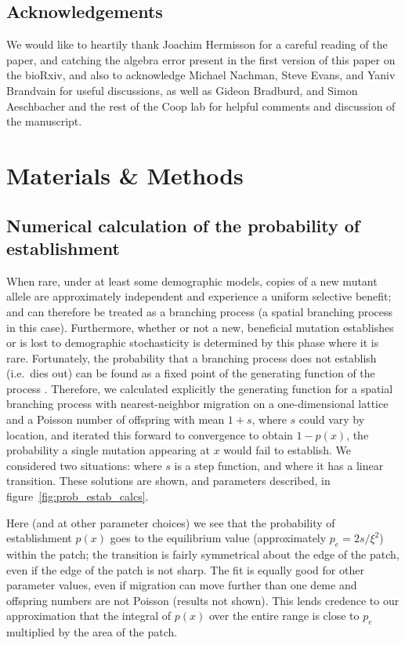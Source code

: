 \documentclass{article}
\newcommand{\citep}[1]{\cite{#1}}
\begin{document}
\subsection*{Acknowledgements}
We would like to heartily thank Joachim Hermisson for a careful reading of the paper,
and catching the algebra error present in the first version of this paper on the bioRxiv,
and also to acknowledge Michael Nachman, Steve Evans, and Yaniv Brandvain for useful discussions, 
as well as Gideon Bradburd, and Simon Aeschbacher and the rest of the Coop lab
for helpful comments and discussion of the manuscript.

\section*{Materials \& Methods}

\subsection[Probability of Establishment]{Numerical calculation of the probability of establishment}
\label{apx:establishment_sims}

When rare, under at least some demographic models,
copies of a new mutant allele are approximately independent and experience a uniform selective benefit;
and can therefore be treated as a branching process (a spatial branching process in this case).
Furthermore, whether or not a new, beneficial mutation establishes or is lost to demographic stochasticity
is determined by this phase where it is rare.
Fortunately, the probability that a branching process does not establish
(i.e.\ dies out)
can be found as a fixed point of the generating function of the process \citep{jagers1975branching}.
Therefore, we calculated explicitly the generating function for a spatial branching process
with nearest-neighbor migration on a one-dimensional lattice
and a Poisson number of offspring with mean $1+s$,
where $s$ could vary by location,
and iterated this forward to convergence to obtain $1-p(x)$, the probability a single mutation appearing at $x$ would fail to establish.
We considered two situations:
where $s$ is a step function,
and where it has a linear transition.
These solutions are shown, and parameters described, in figure~\ref{fig:prob_estab_calcs}.

Here (and at other parameter choices) we see that the probability of establishment $p(x)$ goes to the equilibrium value
(approximately $p_e = 2s/\xi^2$) within the patch;
the transition is fairly symmetrical about the edge of the patch, even if the edge of the patch is not sharp.
The fit is equally good for other parameter values,
even if migration can move further than one deme and offspring numbers are not Poisson (results not shown).
This lends credence to our approximation that the integral of $p(x)$ over the entire range
is close to $p_e$ multiplied by the area of the patch.
\end{document}
